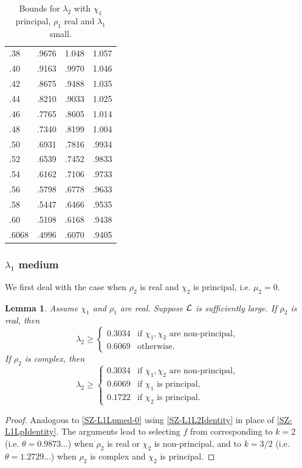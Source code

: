 \documentclass[12pt,psamsfonts]{amsart}
\newtheorem{lem}[thm]{Lemma}
\theoremstyle{definition}
\theoremstyle{remark}
\numberwithin{equation}{section}
\begin{document}
\begin{table}
\begin{tabular}{l|c|c|c}
 .38 &  .9676 &  1.048 &  1.057 \\ 
 .40 &  .9163 &  .9970 &  1.046 \\ 
 .42 &  .8675 &  .9488 &  1.035 \\ 
 .44 &  .8210 &  .9033 &  1.025 \\ 
 .46 &  .7765 &  .8605 &  1.014 \\ 
 .48 &  .7340 &  .8199 &  1.004 \\ 
 .50 &  .6931 &  .7816 &  .9934 \\ 
 .52 &  .6539 &  .7452 &  .9833 \\ 
 .54 &  .6162 &  .7106 &  .9733 \\ 
 .56 &  .5798 &  .6778 &  .9633 \\ 
 .58 &  .5447 &  .6466 &  .9535 \\ 
 .60 &  .5108 &  .6168 &  .9438 \\ 
 .6068 &  .4996 &  .6070 &  .9405 \\ 
\end{tabular}

\caption{Bounds for $\lambda_2$ with $\chi_1$ principal, $\rho_1$ real and $\lambda_1$ small.}
\label{Table-SZ-L1L2small-Chi1Principal}
\end{table}


\subsubsection{$\lambda_1$ medium}

We first deal with the case when $\rho_2$ is real and $\chi_2$ is principal, i.e. $\mu_2 = 0$.  

\begin{lem} \label{SZ-L1L2med-0} Assume $\chi_1$ and $\rho_1$ are real. Suppose $\mathcal{L}$ is sufficiently large. If $\rho_2$ is real, then
\[
\lambda_2 \geq 
\begin{cases} 
0.3034 & \text{if $\chi_1, \chi_2$ are non-principal},  \\
0.6069 & \text{otherwise}.
\end{cases}
\]
If $\rho_2$ is complex, then
\[
\lambda_2 \geq 
\begin{cases} 
0.3034 & \text{if $\chi_1, \chi_2$ are non-principal},  \\
0.6069 & \text{if $\chi_1$ is principal}, \\
0.1722 & \text{if $\chi_2$ is principal}.
\end{cases}
\]

\end{lem}
\begin{proof} Analogous to \cref{SZ-L1Lpmed-0} using \cref{SZ-L1L2Identity} in place of \cref{SZ-L1LpIdentity}. The arguments lead to selecting $f$ from \cite[Lemma 7.5]{HBLinnik} corresponding to $k=2$ (i.e. $\theta = 0.9873...$) when $\rho_2$ is real or $\chi_2$ is non-principal, and to $k=3/2$   (i.e. $\theta = 1.2729...$) when $\rho_2$ is complex and $\chi_2$ is principal. 
\end{proof}
\end{document}
